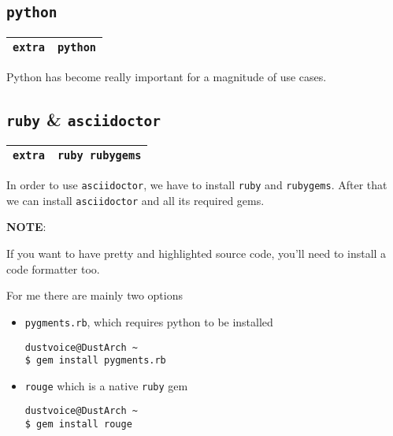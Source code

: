 \documentclass[9pt]{report}
\newcommand{\admonition}[2]{\textbf{#1}: {#2}}
\begin{document}
\vfill\eject

\hypertarget{x-python}{\subsection{\texttt{python}}}
\begin{center}
\begin{tabular}{|c|c|}
\hline
\texttt{extra} & \texttt{python} \\ 
\hline
\end{tabular}
\end{center}

Python has become really important for a magnitude of use cases.



\vfill\eject

\hypertarget{x-ruby-and-asciidoctor}{\subsection{\texttt{ruby} \& \texttt{asciidoctor}}}
\begin{center}
\begin{tabular}{|c|c|}
\hline
\texttt{extra} & \texttt{ruby rubygems} \\ 
\hline
\end{tabular}
\end{center}

In order to use \texttt{asciidoctor}, we have to install \texttt{ruby} and \texttt{rubygems}.
After that we can install \texttt{asciidoctor} and all its required gems.


\admonition{NOTE}{If you want to have pretty and highlighted source code, you’ll need to install a code formatter too.


For me there are mainly two options


}
\begin{itemize}

\item \texttt{pygments.rb}, which requires python to be installed

\begin{verbatim}
dustvoice@DustArch ~
$ gem install pygments.rb
\end{verbatim}
\item \texttt{rouge} which is a native \texttt{ruby} gem

\begin{verbatim}
dustvoice@DustArch ~
$ gem install rouge
\end{verbatim}
\end{itemize}
\end{document}
